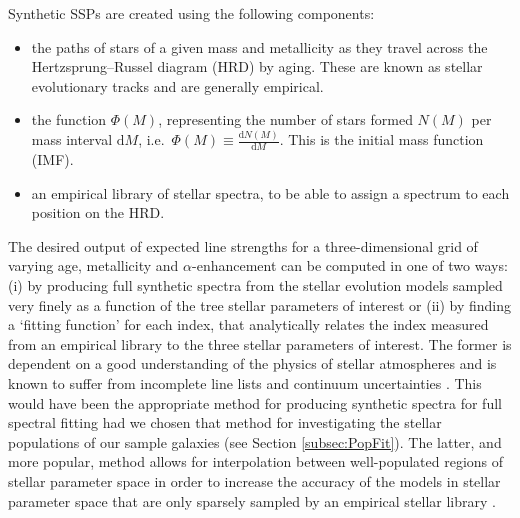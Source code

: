 			Synthetic SSPs are created using the following components:
			\begin{itemize}
				\item the paths of stars of a given mass and metallicity as they travel across the Hertzsprung--Russel diagram (HRD) by aging. These are known as stellar evolutionary tracks and are generally empirical.
				\item the function $\Phi(M)$, representing the number of stars formed $N(M)$ per mass interval $\mathrm{d}M$, i.e.\ $\Phi(M) \equiv \frac{\mathrm{d}N(M)}{\mathrm{d}M}$. This is the initial mass function (IMF).
				\item an empirical library of stellar spectra, to be able to assign a spectrum to each position on the HRD. 
			\end{itemize}
			The desired output of expected line strengths for a three-dimensional grid of varying age, metallicity and $\alpha$-enhancement can be computed in one of two ways: (i) by producing full synthetic spectra from the stellar evolution models sampled very finely as a function of the tree stellar parameters of interest or (ii) by finding a `fitting function' for each index, that analytically relates the index measured from an empirical library to the three stellar parameters of interest. The former is dependent on a good understanding of the physics of stellar atmospheres and is known to suffer from incomplete line lists and continuum uncertainties \citep{Thomas2004}. This would have been the appropriate method for producing synthetic spectra for full spectral fitting had we chosen that method for investigating the stellar populations of our sample galaxies (see Section \ref{subsec:PopFit}). The latter, and more popular, method allows for interpolation between well-populated regions of stellar parameter space in order to increase the accuracy of the models in stellar parameter space that are only sparsely sampled by an empirical stellar library \citep{Thomas2010}. 

